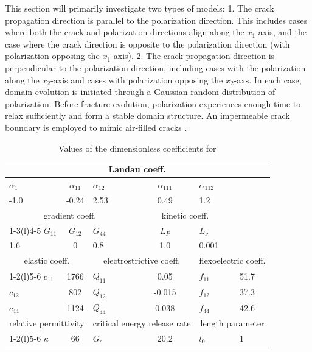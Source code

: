 This section will primarily investigate two types of models: 1. The crack propagation direction is parallel to the polarization direction. This includes cases where both the crack and polarization directions align along the $x_1$-axis, and the case where the crack direction is opposite to the polarization direction (with polarization opposing the $x_1$-axis). 2. The crack propagation direction is perpendicular to the polarization direction, including cases with the polarization along the $x_2$-axis and cases with  polarization opposing the $x_2$-axs. In each case, domain evolution is initiated through a Gaussian random distribution of polarization. Before fracture evolution, polarization experiences enough time to relax sufficiently and form a stable domain structure. An impermeable crack boundary is employed to mimic air-filled cracks \cite{wang_effect_2010}. 

\begin{table}[!htbp]
    \centering
    \caption{Values of the dimensionless coefficients for \cite{yong_zhang_phase_2022,eliseev_defect-driven_2018}}
    \label{table1}
    \begin{tabular}{lclcll}
        \toprule
        \multicolumn{6}{c}{Landau coeff.}                                                   \\ \midrule
        $\alpha_1$ & $\alpha_{11}$ & $\alpha_{12}$ & $\alpha_{111}$   & $\alpha_{112}$  &   \\
        -1.0          & -0.24            & 2.53             & 0.49               & 1.2               &   \\
        \multicolumn{3}{c}{gradient coeff.}        & \multicolumn{2}{c}{kinetic coeff.} &   \\ \cmidrule(r){1-3}\cmidrule(l){4-5}
        $G_{11}$   & $G_{12}$      & $G_{44}$      & $L_P$            & $L_\nu$         &   \\
        1.6          & 0             & 0.8             & 1.0                & 0.001               &   \\
        \multicolumn{2}{c}{elastic coeff.}        & \multicolumn{2}{c}{electrostrictive coeff.}      & \multicolumn{2}{c}{flexoelectric coeff.} \\ \cmidrule(r){1-2}\cmidrule{3-4}\cmidrule(l){5-6}
        $c_{11}$   & 1766             & $Q_{11}$      & 0.05                & $f_{11}$        & 51.7 \\
        $c_{12}$   & 802              & $Q_{12}$      &  -0.015              & $f_{12}$        & 37.3 \\
        $c_{44}$   & 1124             & $Q_{44}$      &  0.038              & $f_{44}$        & 42.6 \\
        \multicolumn{2}{c}{relative permittivity} & \multicolumn{2}{c}{critical energy release rate} & \multicolumn{2}{c}{length parameter}      \\ \cmidrule(r){1-2}\cmidrule{3-4}\cmidrule(l){5-6}
        $\kappa$   & 66            & $G_c$         & 20.2               & $l_0$           & 1 \\ \bottomrule
        \end{tabular}
\end{table}

